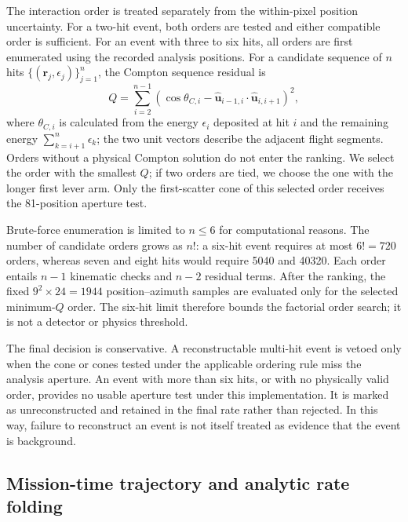 \documentclass[11pt]{article}
\begin{document}
The interaction order is treated separately from the within-pixel position
uncertainty. For a two-hit event, both orders are tested and either compatible
order is sufficient. For an event with three to six hits, all orders are first
enumerated using the recorded analysis positions. For a candidate sequence of
$n$ hits $\{(\mathbf r_j,\epsilon_j)\}_{j=1}^{n}$, the Compton sequence residual
is
\begin{equation}
 Q=\sum_{i=2}^{n-1}\left(\cos\theta_{C,i}-
 \hat{\mathbf u}_{i-1,i}\!\cdot\!\hat{\mathbf u}_{i,i+1}\right)^2,
\end{equation}
where $\theta_{C,i}$ is calculated from the energy $\epsilon_i$ deposited at
hit $i$ and the remaining energy $\sum_{k=i+1}^{n}\epsilon_k$; the two unit
vectors describe the adjacent flight segments. Orders without a physical
Compton solution do not enter the ranking. We select the order with the smallest
$Q$; if two orders are tied, we choose the one with the longer first lever arm.
Only the first-scatter cone of this selected order receives the 81-position
aperture test.

Brute-force enumeration is limited to $n\leq6$ for computational reasons. The
number of candidate orders grows as $n!$: a six-hit event requires at most
$6!=720$ orders, whereas seven and eight hits would require 5040 and 40320.
Each order entails $n-1$ kinematic checks and $n-2$ residual terms. After the
ranking, the fixed $9^2\times24=1944$ position--azimuth samples are evaluated
only for the selected minimum-$Q$ order. The six-hit limit therefore bounds the
factorial order search; it is not a detector or physics threshold.

The final decision is conservative. A reconstructable multi-hit event is vetoed
only when the cone or cones tested under the applicable ordering rule miss the
analysis aperture. An event with more than six hits, or with no physically valid
order, provides no usable aperture test under this implementation. It is marked
as unreconstructed and retained in the final rate rather than rejected. In this
way, failure to reconstruct an event is not itself treated as evidence that the
event is background.

\subsection{Mission-time trajectory and analytic rate folding}
\label{sec:mission_time_fold}
\end{document}
